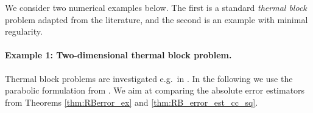 \documentclass{article}
\theoremstyle{plain}
\theoremstyle{definition}
\theoremstyle{remark}
\begin{document}
We consider two numerical examples below. The first is a standard \textit{thermal block} problem adapted from the literature, and the second is an example with minimal regularity.

\paragraph*{Example 1: Two-dimensional thermal block problem.} Thermal block problems are investigated e.g.~in \cites[§~2.2.1, §~3.5.2]{RozzaRB}[§~2.3.1]{haasdonk2017reduced}{Rozza2008}[§~6.1.4]{Hesthaven2016}. In the following we use the parabolic formulation from \cite{Hesthaven2016}. We aim at comparing the absolute error estimators from Theorems \ref{thm:RBerror_ex} and \ref{thm:RB_error_est_cc_sq}.\\
\end{document}
